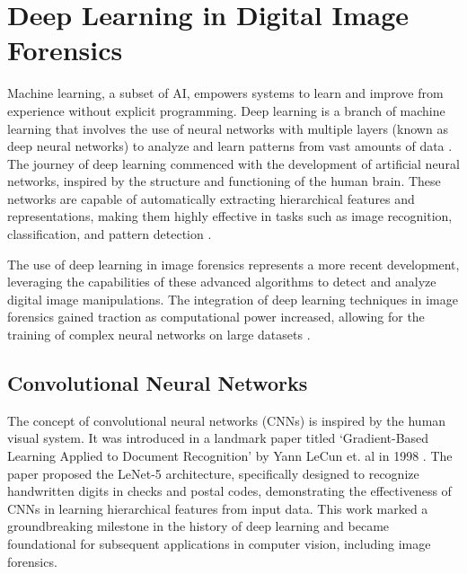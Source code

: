   \section{Deep Learning in Digital Image Forensics} \label{sec:s4}

Machine learning, a subset of AI, empowers systems to learn and improve from experience without explicit programming. Deep learning is a branch of machine learning that involves the use of neural networks with multiple layers (known as deep neural networks) to analyze and learn patterns from vast amounts of data \cite{campesato2020artificial}. The journey of deep learning commenced with the development of artificial neural networks, inspired by the structure and functioning of the human brain. These networks are capable of automatically extracting hierarchical features and representations, making them highly effective in tasks such as image recognition, classification, and pattern detection \cite{nielsen2015neural}.

The use of deep learning in image forensics represents a more recent development, leveraging the capabilities of these advanced algorithms to detect and analyze digital image manipulations. The integration of deep learning techniques in image forensics gained traction as computational power increased, allowing for the training of complex neural networks on large datasets \cite{rota2016bad}.

  \subsection{Convolutional Neural Networks} \label{ssec:s1}

The concept of convolutional neural networks (CNNs) is inspired by the human visual system. It was introduced in a landmark paper titled `Gradient-Based Learning Applied to Document Recognition' by Yann LeCun et. al in 1998 \cite{lecun1998gradient}. The paper proposed the LeNet-5 architecture, specifically designed to recognize handwritten digits in checks and postal codes, demonstrating the effectiveness of CNNs in learning hierarchical features from input data. This work marked a groundbreaking milestone in the history of deep learning and became foundational for subsequent applications in computer vision, including image forensics.


